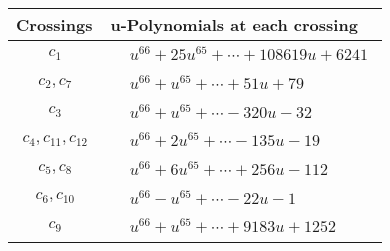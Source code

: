 \documentclass[1p]{elsarticle_modified}
\theoremstyle{definition}
\begin{document}
\begin{tabular}{m{50pt}|m{274pt}}
Crossings & \hspace{64pt}u-Polynomials at each crossing \\
\hline $$\begin{aligned}c_{1}\end{aligned}$$&$\begin{aligned}
&u^{66}+25 u^{65}+\cdots+108619 u+6241
\end{aligned}$\\
\hline $$\begin{aligned}c_{2},c_{7}\end{aligned}$$&$\begin{aligned}
&u^{66}+u^{65}+\cdots+51 u+79
\end{aligned}$\\
\hline $$\begin{aligned}c_{3}\end{aligned}$$&$\begin{aligned}
&u^{66}+u^{65}+\cdots-320 u-32
\end{aligned}$\\
\hline $$\begin{aligned}c_{4},c_{11},c_{12}\end{aligned}$$&$\begin{aligned}
&u^{66}+2 u^{65}+\cdots-135 u-19
\end{aligned}$\\
\hline $$\begin{aligned}c_{5},c_{8}\end{aligned}$$&$\begin{aligned}
&u^{66}+6 u^{65}+\cdots+256 u-112
\end{aligned}$\\
\hline $$\begin{aligned}c_{6},c_{10}\end{aligned}$$&$\begin{aligned}
&u^{66}- u^{65}+\cdots-22 u-1
\end{aligned}$\\
\hline $$\begin{aligned}c_{9}\end{aligned}$$&$\begin{aligned}
&u^{66}+u^{65}+\cdots+9183 u+1252
\end{aligned}$\\
\hline
\end{tabular}\\~\\
\newpage\renewcommand{\arraystretch}{1}
\end{document}
